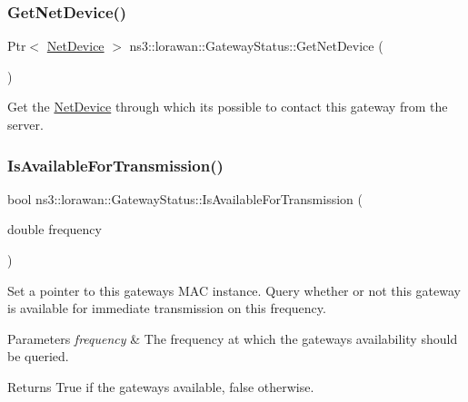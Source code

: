 \subsubsection{\texorpdfstring{Get\+Net\+Device()}{GetNetDevice()}}
{\footnotesize\ttfamily Ptr$<$ \hyperlink{classNetDevice}{Net\+Device} $>$ ns3\+::lorawan\+::\+Gateway\+Status\+::\+Get\+Net\+Device (\begin{DoxyParamCaption}{ }\end{DoxyParamCaption})}

Get the \hyperlink{classNetDevice}{Net\+Device} through which it\textquotesingle{}s possible to contact this gateway from the server. \mbox{\label{classns3_1_1lorawan_1_1GatewayStatus_a09aa68088ae7a91f6c215742eb2e5e6b}} 
\subsubsection{\texorpdfstring{Is\+Available\+For\+Transmission()}{IsAvailableForTransmission()}}
{\footnotesize\ttfamily bool ns3\+::lorawan\+::\+Gateway\+Status\+::\+Is\+Available\+For\+Transmission (\begin{DoxyParamCaption}\item[{double}]{frequency }\end{DoxyParamCaption})}

Set a pointer to this gateway\textquotesingle{}s M\+AC instance. Query whether or not this gateway is available for immediate transmission on this frequency.


\begin{DoxyParams}{Parameters}
{\em frequency} & The frequency at which the gateway\textquotesingle{}s availability should be queried. \\
\hline
\end{DoxyParams}
\begin{DoxyReturn}{Returns}
True if the gateway\textquotesingle{}s available, false otherwise. 
\end{DoxyReturn}
\mbox{\label{classns3_1_1lorawan_1_1GatewayStatus_a073a26dbdcc6431a11ea774697925b1c}} 
